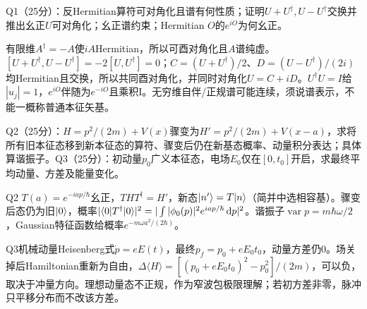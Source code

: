 \begin{exercise}
Q1（25分）：反Hermitian算符可对角化且谱有何性质；证明$U+U^\dagger,U-U^\dagger$交换并推出幺正$U$可对角化；幺正谱约束；Hermitian $O$的$e^{iO}$为何幺正。
\end{exercise}
\begin{solution}
有限维$A^\dagger=-A$使$iA$Hermitian，所以可酉对角化且$A$谱纯虚。$[U+U^\dagger,U-U^\dagger]=-2[U,U^\dagger]=0$；$C=(U+U^\dagger)/2$、$D=(U-U^\dagger)/(2i)$均Hermitian且交换，所以共同酉对角化，并同时对角化$U=C+iD$。$U^\dagger U=I$给$|u_j|=1$，$e^{iO}$伴随为$e^{-iO}$且乘积I。无穷维自伴/正规谱可能连续，须说谱表示，不能一概称普通本征矢基。
\end{solution}
\begin{exercise}
Q2（25分）：$H=p^2/(2m)+V(x)$骤变为$H'=p^2/(2m)+V(x-a)$，求将所有旧本征态移到新本征态的算符、骤变后仍在新基态概率、动量积分表达；具体算谐振子。Q3（25分）：初动量$p_0$广义本征态，电场$E_0$仅在$[0,t_0]$开启，求最终平均动量、方差及能量变化。
\end{exercise}
\begin{solution}
Q2 $T(a)=e^{-iap/\hbar}$幺正，$THT^\dagger=H'$，新态$\lvert n'\rangle=T\lvert n\rangle$（简并中选相容基）。骤变后态仍为旧$\lvert 0\rangle$，概率$|\langle 0\rvert T^\dagger\lvert 0\rangle|^2=|\int|\phi_0(p)|^2e^{iap/\hbar}\,\mathrm d p|^2$。谐振子$\operatorname{var}p=m\hbar\omega/2$，Gaussian特征函数给概率$e^{-m\omega a^2/(2\hbar)}$。

Q3机械动量Heisenberg式$\dot p=eE(t)$，最终$p_f=p_0+eE_0t_0$，动量方差仍0。场关掉后Hamiltonian重新为自由，$\Delta\langle H\rangle=[(p_0+eE_0t_0)^2-p_0^2]/(2m)$，可以负，取决于冲量方向。理想动量态不正规，作为窄波包极限理解；若初方差非零，脉冲只平移分布而不改该方差。
\end{solution}

